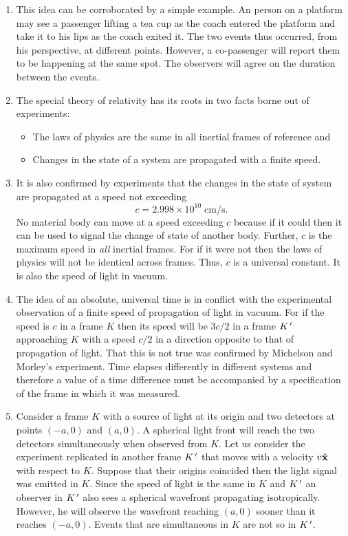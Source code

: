 \begin{enumerate}
\item This idea can be corroborated by a simple example. An person on a platform
may see a passenger lifting a tea cup as the coach entered the platform and take
it to his lips as the coach exited it. The two events thus occurred, from his 
perspective, at different points. However, a co-passenger will report them to
be happening at the same spot. The observers will agree on the duration between
the events.

\item The special theory of relativity has its roots in two facts borne out 
of experiments:
\begin{itemize}
\item The laws of physics are the same in all inertial frames of reference and
\item Changes in the state of a system are propagated with a finite speed.
\end{itemize}

\item It is also confirmed by experiments that the changes in the state of 
system are propagated at a speed not exceeding
\begin{equation}\label{c1e1}
c = 2.998 \times 10^{10} \;\text{cm/s}.
\end{equation}
No material body can move at a speed exceeding $c$ because if it could then it
can be used to signal the change of state of another body. Further, $c$ is the
maximum speed in \emph{all} inertial frames. For if it were not then the laws of
physics will not be identical across frames. Thus, $c$ is a universal constant.
It is also the speed of light in vacuum.

\item The idea of an absolute, universal time is in conflict with the 
experimental observation of a finite speed of propagation of light in vacuum. 
For if the speed is $c$ in a frame $K$ then its speed will be $3c/2$ in a frame 
$K^{\,\prime}$ approaching $K$ with a speed $c/2$ in a direction opposite to that of 
propagation of light. That this is not true was confirmed by Michelson and 
Morley's experiment.  Time elapses differently in different systems and 
therefore a value of a time difference must be accompanied by a specification 
of the frame in which it was measured.

\item Consider a frame $K$ with a source of light at its origin and two 
detectors at points $(-a, 0)$ and $(a, 0)$. A spherical light front will reach 
the two detectors simultaneously when observed from $K$. Let us consider the 
experiment replicated in another frame $K^{\,\prime}$ that moves with a velocity 
$v\hat{\mathbf{x}}$ with respect to $K$. Suppose that their origins coincided then the 
light signal was emitted in $K$. Since the speed of light is the same in $K$ 
and $K^{\,\prime}$ an observer in $K^{\,\prime}$ also sees a spherical wavefront propagating 
isotropically. However, he will observe the wavefront reaching $(a, 0)$ sooner 
than it reaches $(-a, 0)$.  Events that are simultaneous in $K$ are not so in 
$K^{\,\prime}$.


\end{enumerate}
